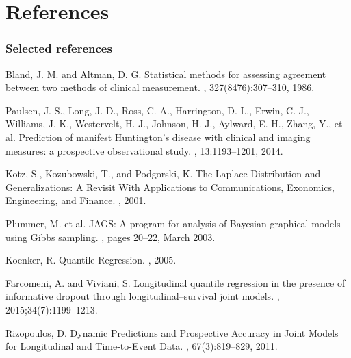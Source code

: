 \documentclass[10pt]{beamer}
\begin{document}
\section{References} %
\begin{frame}[allowframebreaks]
\frametitle{Selected references}

\begin{thebibliography}{8}


 \beamertemplatearticlebibitems
    Bland, J. M. and Altman, D. G.
   \newblock Statistical methods for assessing agreement between two methods of clinical measurement.
    , 327(8476):307--310, 1986.

 \beamertemplatearticlebibitems
    Paulsen, J. S., Long, J. D., Ross, C. A., Harrington, D. L., Erwin, C. J., Williams, J. K., Westervelt, H. J., Johnson, H. J., Aylward, E. H., Zhang, Y., et al.
    \newblock Prediction of manifest Huntington's disease with clinical and imaging measures: a prospective observational study.
    , 13:1193--1201, 2014.


 \beamertemplatearticlebibitems
    Kotz, S., Kozubowski, T., and Podgorski, K.
    \newblock The Laplace Distribution and Generalizations: A Revisit With Applications to Communications, Exonomics, Engineering, and Finance.
    , 2001.

 \beamertemplatearticlebibitems
   Plummer, M. et al.
   \newblock JAGS: A program for analysis of Bayesian graphical models using Gibbs sampling.
   , pages 20--22, March 2003.
%

 \beamertemplatebookbibitems
    Koenker, R.
    \newblock Quantile Regression.
    , 2005.

  \beamertemplatearticlebibitems
    Farcomeni, A. and Viviani, S.
    \newblock Longitudinal quantile regression in the presence of informative dropout through longitudinal--survival joint models.
    , 2015;34(7):1199–1213.



  \beamertemplatearticlebibitems
    Rizopoulos, D.
    \newblock Dynamic Predictions and Prospective Accuracy in Joint Models for Longitudinal and Time-to-Event Data.
    , 67(3):819--829, 2011.



\end{thebibliography}
\end{frame}
\end{document}
